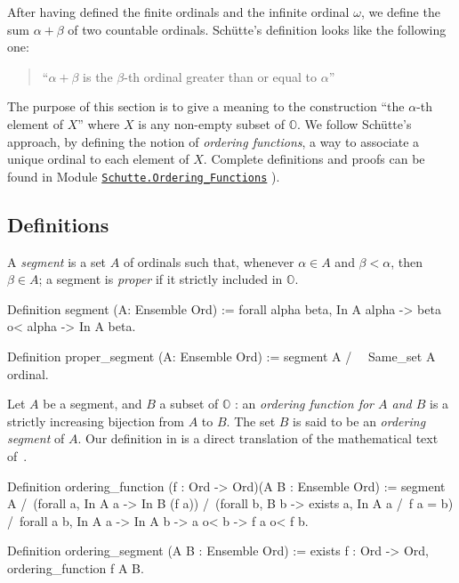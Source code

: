{After having defined the finite ordinals and the infinite ordinal $\omega$, we  define the sum $\alpha+\beta$ of two countable ordinals.
Schütte's definition looks like the following one:

\begin{quote}
``$\alpha+\beta$ is the $\beta$-th ordinal greater than or equal to $\alpha$''
\end{quote}


The purpose of this section is to give a meaning to the construction
``the $\alpha$-th element of $X$''  where $X$ is any non-empty subset of $\mathbb{O}$.
We follow Schütte's approach, by defining the notion of \emph{ordering functions},
a way to associate a unique ordinal to each element of $X$.
Complete definitions and proofs can be found in Module
 \href{../src/html/hydras.Schutte.Ordering_Functions.html}%
{\texttt{Schutte.Ordering\_Functions}} ).

\subsection{Definitions}

A \emph{segment} is a set $A$ of ordinals such that, whenever  $\alpha\in A$ and
$\beta<\alpha$, then $\beta\in A$; a segment is  \emph{proper} if it strictly included in $\mathbb{O}$.

\begin{Coqsrc}
 Definition segment (A: Ensemble Ord) :=
  forall alpha beta, In A alpha -> beta o< alpha -> In A  beta.

Definition proper_segment (A: Ensemble Ord) :=
  segment A /\ ~ Same_set A ordinal.
\end{Coqsrc}


Let  $A$ be a segment, and $B$ a subset of $\mathbb{O}$ : an \emph{ordering function for $A$ and  $B$} is a strictly increasing bijection from $A$ to $B$.
The set $B$ is said to be an \emph{ordering segment} of $A$.
Our definition in \coq{} is a direct translation of the mathematical text of~\cite{schutte}.


\begin{Coqsrc}
Definition ordering_function (f : Ord -> Ord)(A B : Ensemble Ord) :=
 segment A /\
 (forall a, In A a -> In B (f a)) /\
 (forall b, B b -> exists a, In A a /\ f a = b) /\
 forall a b, In A a -> In A b -> a o< b ->  f a o< f b.

Definition ordering_segment (A B : Ensemble Ord) :=
  exists f : Ord -> Ord, ordering_function f A B.
\end{Coqsrc}


}
